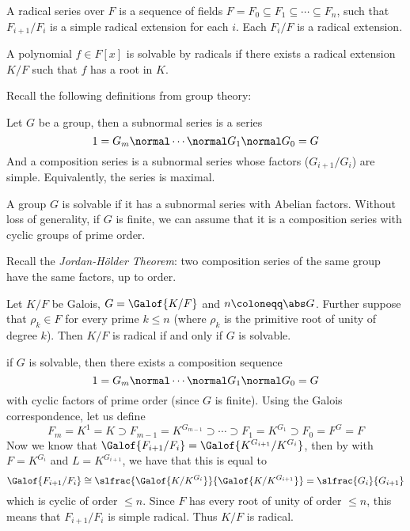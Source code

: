 \bdefn

    A {\emphcolor radical series} over $F$ is a sequence of fields $F=F_0\subseteq F_1\subseteq\cdots\subseteq F_n$, such that $F_{i+1}/F_i$ is a simple radical extension for each $i$.
    Each $F_i/F$ is a {\emphcolor radical extension}.

\edefn

\bdefn

    A polynomial $f\in F[x]$ is {\emphcolor solvable by radicals} if there exists a radical extension $K/F$ such that $f$ has a root in $K$.

\edefn

Recall the following definitions from group theory:

\bdefn

    Let $G$ be a group, then a {\emphcolor subnormal series} is a series
    $$ 1 = G_m \normal \cdots \normal G_1 \normal G_0 = G $$
    And a {\emphcolor composition series} is a subnormal series whose factors ($G_{i+1}/G_i$) are simple.
    Equivalently, the series is maximal.

    A group $G$ is {\emphcolor solvable} if it has a subnormal series with Abelian factors.
    Without loss of generality, if $G$ is finite, we can assume that it is a composition series with cyclic groups of prime order.

\edefn

Recall the {\it Jordan-H\"older Theorem}: two composition series of the same group have the same factors, up to order.

\bthrm

    Let $K/F$ be Galois, $G=\Galof{K/F}$ and $n\coloneqq\abs G$.
    Further suppose that $\rho_k\in F$ for every prime $k\leq n$ (where $\rho_k$ is the primitive root of unity of degree $k$).
    Then $K/F$ is radical if and only if $G$ is solvable.

\ethrm

\Proof if $G$ is solvable, then there exists a composition sequence
$$ 1 = G_m \normal \cdots \normal G_1 \normal G_0 = G $$
with cyclic factors of prime order (since $G$ is finite).
Using the Galois correspondence, let us define
$$ F_m = K^1 = K \supset F_{m-1} = K^{G_{m-1}} \supset \cdots \supset F_1 = K^{G_1} \supset F_0 = F^G = F $$
Now we know that $\Galof{F_{i+1}/F_i}=\Galof{K^{G_{i+1}}/K^{G_i}}$, then by  with $F=K^{G_i}$ and $L=K^{G_{i+1}}$, we have that this is equal to
$$ \Galof{F_{i+1}/F_i} \cong \slfrac{\Galof{K/K^{G_i}}}{\Galof{K/K^{G_{i+1}}}} = \slfrac{G_i}{G_{i+1}} $$
which is cyclic of order $\leq n$.
Since $F$ has every root of unity of order $\leq n$, this means that $F_{i+1}/F_i$ is simple radical.
Thus $K/F$ is radical.

